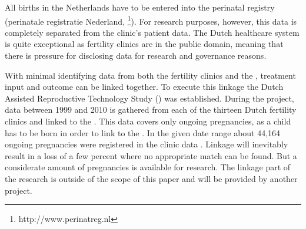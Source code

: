 All births in the Netherlands have to be entered into the perinatal registry (perinatale registratie Nederland, \PRN{}\footnote{http://www.perinatreg.nl}).
For research purposes, however, this data is completely separated from the clinic's patient data.
The Dutch healthcare system is quite exceptional as fertility clinics are in the public domain, 
meaning that there is pressure for disclosing  data for research and governance reasons.

With minimal identifying data from both the fertility clinics and the \PRN{}, treatment input and outcome can be linked together.
To execute this linkage the Dutch Assisted Reproductive Technology Study (\project{}) was established.
During the project, data between 1999 and 2010 is gathered from each of the thirteen Dutch fertility clinics and linked to the \PRN{}.
This data covers only ongoing pregnancies, as a child has to be born in order to link to the \PRN{}.
In the given date range about 44,164 ongoing pregnancies were registered in the clinic data \cite{ivfReportNVOG}.
Linkage will inevitably result in a loss of a few percent where no appropriate match can be found.
But a considerate amount of pregnancies is available for research.
The linkage part of the research is outside of the scope of this paper and will be provided by another project.